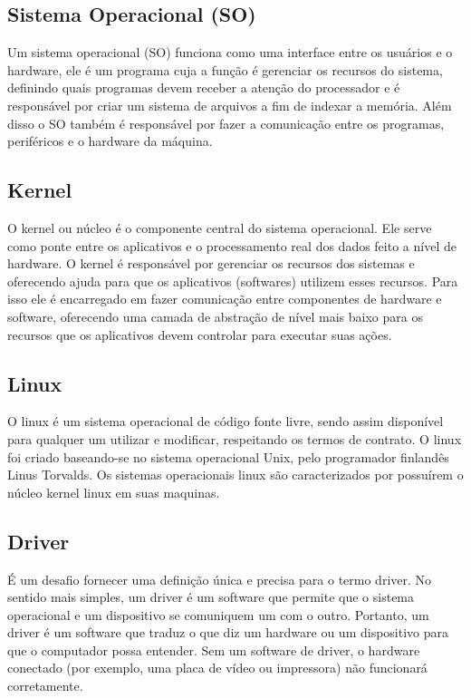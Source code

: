 \subsection{Sistema Operacional (SO)}

Um sistema operacional (SO) funciona como uma interface entre os usuários e o hardware, ele é um programa cuja a função é gerenciar os recursos do sistema, definindo quais programas devem receber a atenção do processador e é responsável por criar um sistema de arquivos a fim de indexar a memória. Além disso o SO também é responsável por fazer a comunicação entre os programas, periféricos e o hardware da máquina. 

\subsection{Kernel}

O kernel ou núcleo é o componente central do sistema operacional. Ele serve como ponte entre os aplicativos e o processamento real dos dados feito a nível de hardware. O kernel é responsável por gerenciar os recursos dos sistemas e oferecendo ajuda para que os aplicativos (softwares) utilizem esses recursos. Para isso ele é encarregado em fazer comunicação entre componentes de hardware e software, oferecendo uma camada de abstração de nível mais baixo para os recursos que os aplicativos devem controlar para executar suas ações. 

\subsection{Linux}

O linux é um sistema operacional de código fonte livre, sendo assim disponível para qualquer um utilizar e modificar, respeitando os termos de contrato. O linux foi criado baseando-se no sistema operacional Unix, pelo programador finlandês Linus Torvalds. Os sistemas operacionais linux são caracterizados por possuírem o núcleo kernel linux em suas maquinas. 

\subsection{Driver}

 É um desafio fornecer uma definição única e precisa para o termo driver. No sentido mais simples, um driver é um software que permite que o sistema operacional e um dispositivo se comuniquem um com o outro. Portanto, um driver é um software que traduz o que diz um hardware ou um dispositivo para que o computador possa entender. Sem um software de driver, o hardware conectado (por exemplo, uma placa de vídeo ou impressora) não funcionará corretamente.

